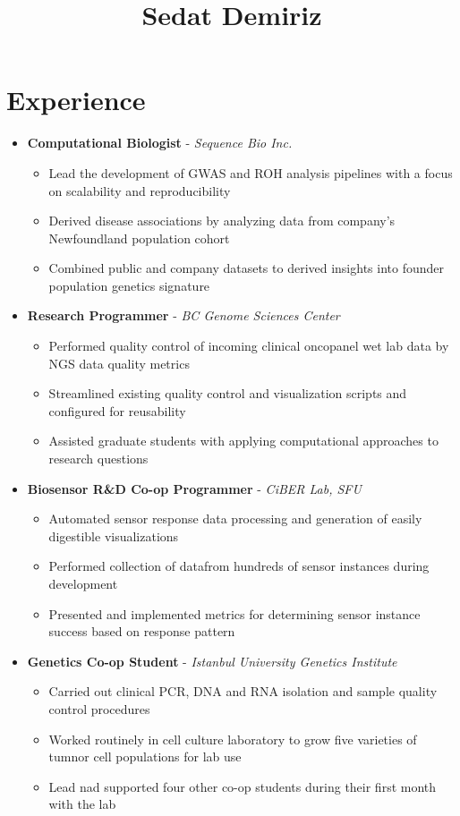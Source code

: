 \documentclass{article}
\title{Sedat Demiriz}
\begin{document}
  \maketitle

\section*{Experience}
\hrulefill
\begin{itemize}
  \item[] \textbf{Computational Biologist} - \textit{Sequence Bio Inc.}
    \begin{itemize}
      \item[] Lead the development of GWAS and ROH analysis pipelines with a focus on scalability and reproducibility
      \item[] Derived disease associations by analyzing data from company's Newfoundland population cohort
      \item[] Combined public and company datasets to derived insights into founder population genetics signature
    \end{itemize}
  \item[] \textbf{Research Programmer} - \textit{BC Genome Sciences Center}
    \begin{itemize}
      \item[] Performed quality control of incoming clinical oncopanel wet lab data by NGS data quality metrics
      \item[] Streamlined existing quality control and visualization scripts and configured for reusability
      \item[] Assisted graduate students with applying computational approaches to research questions
    \end{itemize}
  \item[] \textbf{Biosensor R\&D Co-op Programmer} - \textit{CiBER Lab, SFU}
    \begin{itemize}
      \item[] Automated sensor response data processing and generation of easily digestible visualizations
      \item[] Performed collection of datafrom hundreds of sensor instances during development
      \item[] Presented and implemented metrics for determining sensor instance success based on response pattern
    \end{itemize}
  \item[] \textbf{Genetics Co-op Student} - \textit{Istanbul University Genetics Institute}
    \begin{itemize}
      \item[] Carried out clinical PCR, DNA and RNA isolation and sample quality control procedures
      \item[] Worked routinely in cell culture laboratory to grow five varieties of tumnor cell populations for lab use
      \item[] Lead nad supported four other co-op students during their first month with the lab
    \end{itemize}
\end{itemize}
\end{document}
